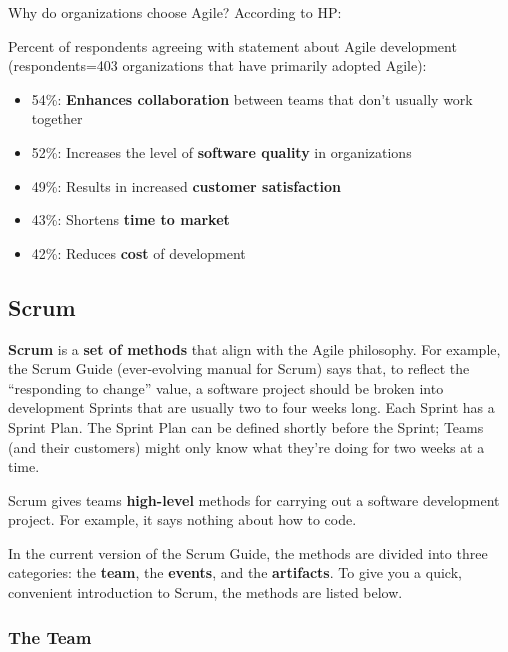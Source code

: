 Why do organizations choose Agile? According to HP:

\spacer
\noindent Percent of respondents agreeing with statement about Agile development (respondents=403 organizations that have primarily adopted Agile):

\begin{itemize}
\item 54\%: \textbf{Enhances collaboration} between teams that don't usually work together
\item 52\%: Increases the level of \textbf{software quality} in organizations
\item 49\%: Results in increased \textbf{customer satisfaction}
\item 43\%: Shortens \textbf{time to market}
\item 42\%: Reduces \textbf{cost} of development
\end{itemize}


\subsection{Scrum}

\textbf{Scrum} is a \textbf{set of methods} that align with the Agile philosophy. For example, the Scrum Guide (ever-evolving manual for Scrum) \parencite{schwaber2020scrum} says that, to reflect the ``responding to change'' value, a software project should be broken into development Sprints that are usually two to four weeks long. Each Sprint has a Sprint Plan. The Sprint Plan can be defined shortly before the Sprint; Teams (and their customers) might only know what they're doing for two weeks at a time.

Scrum gives teams \textbf{high-level} methods for carrying out a software development project. For example, it says nothing about how to code.

In the current version of the Scrum Guide, the methods are divided into three categories: the \textbf{team}, the \textbf{events}, and the \textbf{artifacts}. To give you a quick, convenient introduction to Scrum, the methods are listed below.

\subsubsection{The Team}

